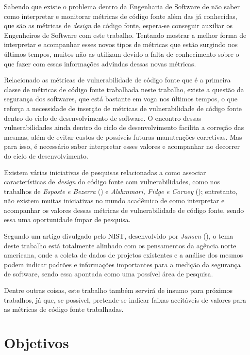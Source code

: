Sabendo que existe o problema dentro da Engenharia de Software de não saber como
interpretar e monitorar métricas de código fonte além das já conhecidas, que são 
as métricas de \textit{design} de código fonte, espera-se conseguir auxiliar os 
Engenheiros de Software com este trabalho. Tentando mostrar a melhor forma de 
interpretar e acompanhar esses novos tipos de métricas que estão surgindo nos últimos
tempos, muitos não as utilizam devido a falta de conhecimento sobre o que fazer
com essas informações advindas dessas novas métricas.

Relacionado as métricas de vulnerabilidade de código fonte que é a primeira
classe de métricas de código fonte trabalhada neste trabalho, existe a
questão da segurança dos softwares, que está bastante em voga nos últimos
tempos, o que reforça a necessidade de inserção de métricas de vulnerabilidade
de código fonte dentro do ciclo de desenvolvimento de software. O encontro
dessas vulnerabilidades ainda dentro do ciclo de desenvolvimento facilita a
correção das mesmas, além de evitar custos de possíveis futuras manutenções
corretivas. Mas para isso, é necessário saber interpretar esses valores
e acompanhar no decorrer do ciclo de desenvolvimento.

Existem várias iniciativas de pesquisas relacionadas a como associar
características de \textit{design} do código fonte com vulnerabilidades, como
nos trabalhos de \emph{Esposte e Bezerra} (\citeyear{arthur&carlos2014}) e
\emph{Alshmmari, Fidge e Corney} (\citeyear{alshammari2009}); entretanto, não
existem muitas iniciativas no mundo acadêmico de como interpretar e acompanhar
os valores dessas métricas de vulnerabilidade de código fonte, sendo essa uma
oportunidade ímpar de pesquisa.

Segundo um artigo divulgado pelo NIST, desenvolvido por \emph{Jansen}
(\citeyear{jansen2009}), o tema deste trabalho está totalmente alinhado com os
pensamentos da agência norte americana, onde a coleta de dados de projetos
existentes e a análise dos mesmos podem indicar padrões e informações
importantes para a medição da segurança de software, sendo essa apontada como
uma possível área de pesquisa.

Dentre outras coisas, este trabalho também servirá de insumo para próximos
trabalhos, já que, se possível, pretende-se indicar faixas aceitáveis de valores 
para as métricas de código fonte trabalhadas.

\section{Objetivos} \label{sec:objetivos}

